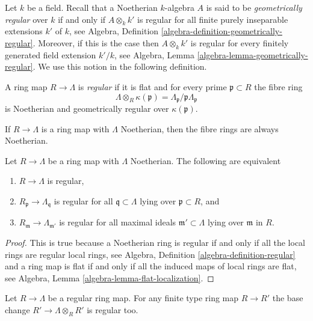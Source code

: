 \noindent
Let $k$ be a field. Recall that a Noetherian $k$-algebra $A$ is
said to be {\it geometrically regular} over $k$ if and only if
$A \otimes_k k'$ is regular for all finite purely inseparable
extensions $k'$ of $k$, see
Algebra, Definition \ref{algebra-definition-geometrically-regular}.
Moreover, if this is the case then $A \otimes_k k'$ is regular
for every finitely generated field extension $k'/k$, see
Algebra, Lemma \ref{algebra-lemma-geometrically-regular}.
We use this notion in the following definition.

\begin{definition}
\label{definition-regular}
A ring map $R \to \Lambda$ is {\it regular} if it is flat and
for every prime $\mathfrak p \subset R$ the fibre ring
$$
\Lambda \otimes_R \kappa(\mathfrak p) =
\Lambda_\mathfrak p/\mathfrak p\Lambda_\mathfrak p
$$
is Noetherian and geometrically regular over $\kappa(\mathfrak p)$.
\end{definition}

\noindent
If $R \to \Lambda$ is a ring map with $\Lambda$ Noetherian, then the
fibre rings are always Noetherian.

\begin{lemma}
\label{lemma-regular-local}
Let $R \to \Lambda$ be a ring map with $\Lambda$ Noetherian.
The following are equivalent
\begin{enumerate}
\item $R \to \Lambda$ is regular,
\item $R_\mathfrak p \to \Lambda_\mathfrak q$ is regular for all
$\mathfrak q \subset \Lambda$ lying over $\mathfrak p \subset R$, and
\item $R_\mathfrak m \to \Lambda_{\mathfrak m'}$ is regular for
all maximal ideals $\mathfrak m' \subset \Lambda$
lying over $\mathfrak m$ in $R$.
\end{enumerate}
\end{lemma}

\begin{proof}
This is true because a Noetherian ring is regular if and only if
all the local rings are regular local rings, see
Algebra, Definition \ref{algebra-definition-regular}
and a ring map is flat if and only if all the induced maps of local
rings are flat, see
Algebra, Lemma \ref{algebra-lemma-flat-localization}.
\end{proof}

\begin{lemma}
\label{lemma-regular-base-change}
Let $R \to \Lambda$ be a regular ring map.
For any finite type ring map $R \to R'$ the base change
$R' \to \Lambda \otimes_R R'$ is regular too.
\end{lemma}

